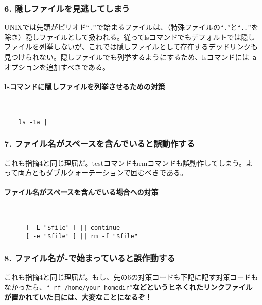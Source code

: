 \subsubsection*{6. 隠しファイルを見逃してしまう}

UNIXでは先頭がピリオド``\verb|.|''で始まるファイルは、（特殊ファイルの``\verb|.|''と``\verb|..|''を除き）隠しファイルとして扱われる。従ってlsコマンドでもデフォルトでは隠しファイルを列挙しないが、これでは隠しファイルとして存在するデッドリンクも見つけられない。隠しファイルでも列挙するようにするため、lsコマンドには\verb|-a|オプションを追加すべきである。

\paragraph{lsコマンドに隠しファイルを列挙させるための対策} 　\\
\begin{frameboxit}{160.0mm}
\begin{verbatim}
	ls -1a |
\end{verbatim}
\end{frameboxit}

\subsubsection*{7. ファイル名がスペースを含んでいると誤動作する}

これも指摘4と同じ理屈だ。testコマンドもrmコマンドも誤動作してしまう。よって両方ともダブルクォーテーションで囲むべきである。

\paragraph{ファイル名がスペースを含んでいる場合への対策} 　\\
\begin{frameboxit}{160.0mm}
\begin{verbatim}
	  [ -L "$file" ] || continue
	  [ -e "$file" ] || rm -f "$file"
\end{verbatim}
\end{frameboxit}

\subsubsection*{8. ファイル名が\verb|-|で始まっていると誤作動する}

これも指摘4と同じ理屈だ。もし、先の6の対策コードも下記に記す対策コードもなかったら、``\verb|-rf /home/your_homedir|''\textbf{などというヒネくれたリンクファイルが置かれていた日には、大変なことになるぞ！}

